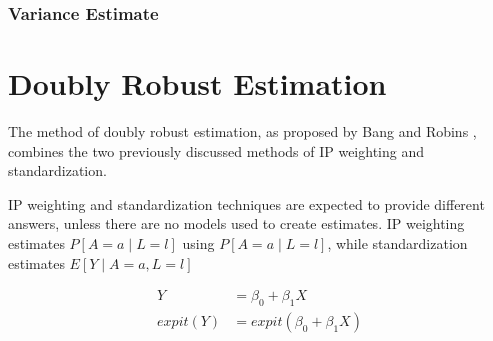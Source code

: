 \subsubsection{Variance Estimate} 


\section{Doubly Robust Estimation} 
The method of doubly robust estimation, as proposed by Bang and Robins \cite{bang2005doubly}, combines the two previously discussed methods of IP weighting and standardization.  

IP weighting and standardization techniques are expected to provide different answers, unless there are no models used to create estimates.\cite{hernan_robins_2016}  
IP weighting estimates $P[A=a \mid L =l]$ using $P[A =a \mid L= l]$, while standardization estimates $E[Y \mid A = a, L=l]$  
\newpage 

\begin{align*} 
Y &= \beta_0 + \beta_1 X \\ 
expit(Y) &= expit(\beta_0 + \beta_1 X) \\ 
\end{align*} 
